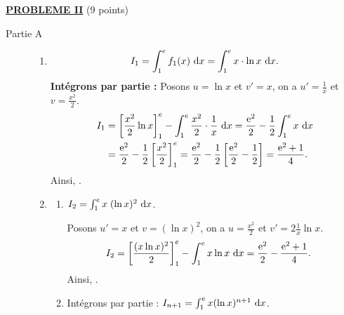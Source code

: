 \noindent \underline{\textsc{\textbf{PROBLEME II}}} (9 points) \newline
	\begin{description}
		\item[Partie A]
			\begin{enumerate}
				\item {}
							\[
								I_1 = \int_{1}^{e} f_1 (x) ~\mathrm{d}x = \int_{1}^{e} x \cdot \ln x ~\mathrm{d}x .
							\]
							\textbf{Int\'egrons par partie :} 
							Posons $u = \ln x $ et $v' = x$, on a $u' = \frac{1}{x}$ et $v = \frac{x^2}{2}$.
							\begin{align*}
								I_1	& = \left[ \frac{x^2}{2} \ln x \right]_{1}^{e} - \int_{1}^{e} \frac{x^2}{2} \cdot \frac{1}{x} ~\mathrm{d}x	
									  = \frac{\mathrm{e}^{2}}{2} - \frac{1}{2} \int_{1}^{e} x ~\mathrm{d}x \\
									& = \frac{\mathrm{e}^{2}}{2} - \frac{1}{2} \left[ \frac{x^2}{2} \right]_{1}^{e}	
									  = \frac{\mathrm{e}^{2}}{2} - \frac{1}{2} \left[ \frac{\mathrm{e}^{2}}{2} - \frac{1}{2} \right] 
									  = \frac{\mathrm{e}^{2} + 1}{4} .
							\end{align*}
							Ainsi, .
				\item 
					\begin{enumerate}
						\item {}
							$I_2 = \int_{1}^{e} x \; (\ln x)^2 ~\mathrm{d}x$.
							
							Posons $u' = x$ et $v = (\ln x)^2$, on a $u = \frac{x^2}{2}$ et $v' = 2 \frac{1}{x} \ln x$.
							\begin{align*}
								I_2	& = \left[ \frac{(x \ln x)^2}{2} \right]_{1}^{e} - \int_{1}^{e} x \ln x ~\mathrm{d}x 
									  = \frac{\mathrm{e}^{2}}{2} - \frac{\mathrm{e}^{2}+1}{4} .
							\end{align*}
							Ainsi, .
						\item {}
							Int\'egrons par partie :
							$I_{n+1} = \int_{1}^{e} x (\ln x)^{n+1} ~\mathrm{d}x$.
							

\end{enumerate}
\end{enumerate}
\end{description}
